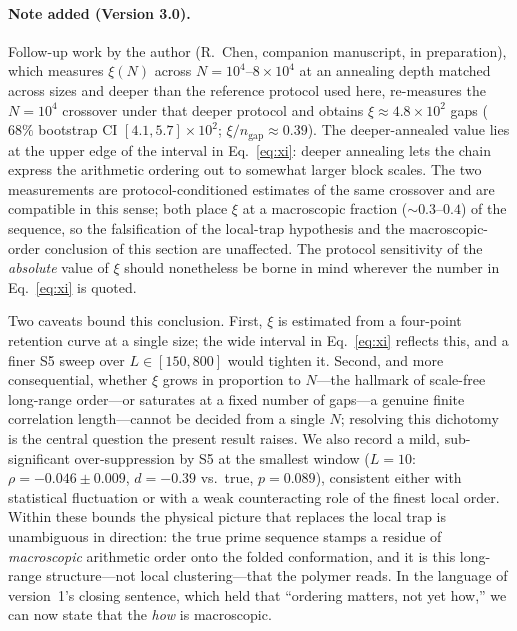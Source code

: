 \documentclass[11pt]{article}
\begin{document}
\paragraph*{Note added (Version 3.0).}
Follow-up work by the author (R.~Chen, companion manuscript, in preparation), which
measures $\xi(N)$ across
$N = 10^{4}$--$8\times10^{4}$ at an annealing depth matched across sizes and deeper
than the reference protocol used here, re-measures the $N=10^{4}$ crossover under
that deeper protocol and obtains $\xi \approx 4.8\times10^{2}$ gaps ($68\%$
bootstrap CI $[4.1, 5.7]\times10^{2}$; $\xi/n_{\mathrm{gap}} \approx 0.39$). The
deeper-annealed value lies at the upper edge of the interval in Eq.~\eqref{eq:xi}:
deeper annealing lets the chain express the arithmetic ordering out to somewhat
larger block scales. The two measurements are protocol-conditioned estimates of the
same crossover and are compatible in this sense; both place $\xi$ at a macroscopic
fraction (${\sim}0.3$--$0.4$) of the sequence, so the falsification of the
local-trap hypothesis and the macroscopic-order conclusion of this section are
unaffected. The protocol sensitivity of the \emph{absolute} value of $\xi$ should
nonetheless be borne in mind wherever the number in Eq.~\eqref{eq:xi} is quoted.

Two caveats bound this conclusion. First, $\xi$ is estimated from a four-point
retention curve at a single size; the wide interval in Eq.~\eqref{eq:xi} reflects
this, and a finer S5 sweep over $L \in [150, 800]$ would tighten it. Second, and more
consequential, whether $\xi$ grows in proportion to $N$---the hallmark of scale-free
long-range order---or saturates at a fixed number of gaps---a genuine finite
correlation length---cannot be decided from a single $N$; resolving this dichotomy is
the central question the present result raises. We also record a mild,
sub-significant over-suppression by S5 at the smallest window ($L=10$:
$\rho = -0.046 \pm 0.009$, $d = -0.39$ vs.\ true, $p = 0.089$), consistent either with
statistical fluctuation or with a weak counteracting role of the finest local order.
Within these bounds the physical picture that replaces the local trap is unambiguous
in direction: the true prime sequence stamps a residue of \emph{macroscopic}
arithmetic order onto the folded conformation, and it is this long-range
structure---not local clustering---that the polymer reads. In the language of
version~1's closing sentence, which held that ``ordering matters, not yet how,'' we
can now state that the \emph{how} is macroscopic.
\end{document}
